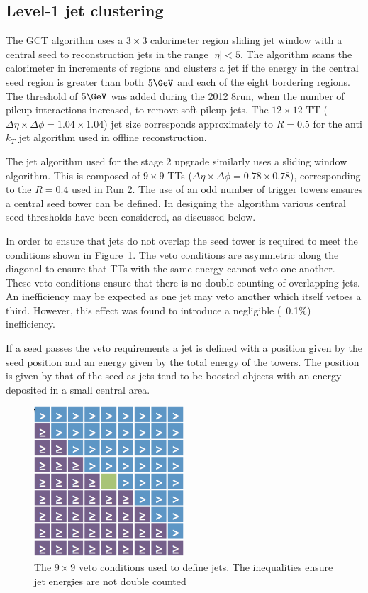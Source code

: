 \subsection{Level-1 jet clustering}
\label{sec:jet_algo}
The GCT algorithm uses a $3\times3$ calorimeter region sliding jet window with a central seed 
to reconstruction jets in the range $|\eta| < 5$. The algorithm scans the calorimeter in increments
of regions and clusters a jet if the energy in the central seed region is greater than 
both $5\GeV$ and each of the eight bordering regions. The threshold of $5\GeV$ was added during 
the 2012 8\TeV run, when the number of pileup interactions increased, to remove soft pileup jets.
The $12\times12$ TT ($\Delta\eta\times\Delta\phi = 1.04\times1.04$) jet size corresponds 
approximately to $R=0.5$ for the anti$k_T$ jet algorithm used in offline reconstruction.

The jet algorithm used for the stage 2 upgrade similarly uses a sliding window algorithm. This
is composed of $9\times9$ TTs ($\Delta\eta\times\Delta\phi = 0.78\times0.78$), corresponding 
to the $R=0.4$ used in Run 2. The use of an odd number of trigger towers ensures a central 
seed tower can be defined. In designing the algorithm various central seed thresholds have 
been considered, as discussed below.

In order to ensure that jets do not overlap the seed tower is required to meet the conditions
shown in Figure~\ref{mask}. The veto conditions are asymmetric along the diagonal to ensure  
that TTs with the same energy cannot veto one another. These veto conditions ensure that there 
is no double counting of overlapping jets. An inefficiency may be expected 
as one jet may veto another which itself vetoes a third. However, this effect was found to 
introduce a negligible (~0.1\%) inefficiency.

If a seed passes the veto requirements a jet is defined with a position given
by the seed position and an energy given by the total energy of the towers. The position is
given by that of the seed as jets tend to be boosted objects with an energy deposited in
a small central area.

\begin{figure}
\centering
    \includegraphics[width=0.5\textwidth]{./Figures/triggerUpgrade/mask.png}
  \caption{The $9\times9$ veto conditions used to define jets. The inequalities ensure
  jet energies are not double counted}
  \label{mask}
\end{figure}

